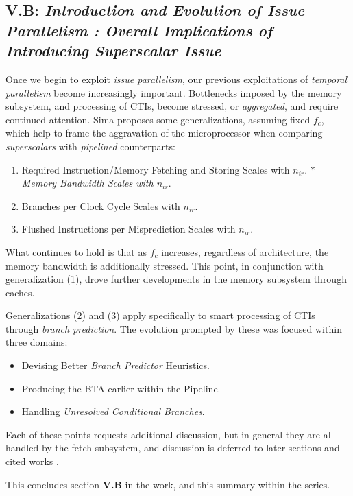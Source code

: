 \documentclass{article}
\begin{document}
\subsection{\textbf{V.B}: \emph{Introduction and Evolution of Issue Parallelism : Overall Implications of Introducing Superscalar Issue}}
Once we begin to exploit \emph{issue parallelism}, our previous exploitations of \emph{temporal parallelism} become increasingly important.
Bottlenecks imposed by the memory subsystem, and processing of CTIs, become stressed, or \emph{aggregated}, and require continued attention.
Sima proposes some generalizations, assuming fixed $f_{c}$, which help to frame the aggravation of the microprocessor when comparing \emph{superscalars} with \emph{pipelined} counterparts:
\begin{enumerate}
    \item Required Instruction/Memory Fetching and Storing Scales with $n_{ir}$.
    \subitem \(\ast\) \emph{Memory Bandwidth Scales with $n_{ir}$}.
    \item Branches per Clock Cycle Scales with $n_{ir}$.
    \item Flushed Instructions per Misprediction Scales with $n_{ir}$.
\end{enumerate}
What continues to hold is that as $f_{c}$ increases, regardless of architecture, the memory bandwidth is additionally stressed.
This point, in conjunction with generalization (1), drove further developments in the memory subsystem through caches.

Generalizations (2) and (3) apply specifically to smart processing of CTIs through \emph{branch prediction}.
The evolution prompted by these was focused within three domains:
\begin{itemize}
    \item[\(\diamond\)] Devising Better \emph{Branch Predictor} Heuristics.
    \item[\(\diamond\)] Producing the BTA earlier within the Pipeline.
    \item[\(\diamond\)] Handling \emph{Unresolved Conditional Branches}.
\end{itemize}
Each of these points requests additional discussion, but in general they are all handled by the fetch subsystem, and discussion is deferred to later sections and cited works \cite{Sima}.

This concludes section \textbf{V.B} in the work, and this summary within the series.
\end{document}
